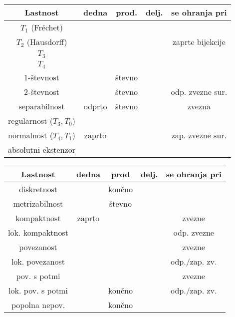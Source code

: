 \documentclass[10pt,a4paper]{article}
\newcommand{\cmark}{\checkmark}%
\newcommand{\xmark}{\ding{55}}%
\begin{document}
\vspace{-3mm}
\begin{table}[htbp]
    \begin{tabular}{|c|c|c|c|c|}\hline
        Lastnost                & dedna & prod. & delj. & se ohranja pri    \\ \hline
        $T_1$ (Fréchet)         & \cmark& \cmark& \xmark&                   \\ \hline
        $T_2$ (Hausdorff)       & \cmark& \cmark& \xmark& zaprte bijekcije  \\ \hline
        $T_3$                   & \cmark& \cmark& \xmark&                   \\ \hline
        $T_4$                   &       &   	& \xmark&                   \\ \hline
        $1$-števnost            & \cmark& števno& \xmark&                   \\ \hline
        $2$-števnost            & \cmark& števno& \xmark& odp. zvezne sur.  \\ \hline
        separabilnost           & odprto& števno& \cmark& zvezna            \\ \hline
        regularnost ($T_3, T_0$)& \cmark& \cmark&       &                   \\ \hline
        normalnost ($T_4, T_1$) & zaprto&       &       & zap. zvezne sur.  \\ \hline
        absolutni ekstenzor     &       & \cmark&       &                   \\ \hline
    \end{tabular}
    \begin{tabular}{|c|c|c|c|c|} \hline
        Lastnost          & dedna & prod  & delj. & se ohranja pri\\ \hline
        diskretnost       & \cmark& končno& \cmark&               \\ \hline
        metrizabilnost    & \cmark& števno& \xmark&               \\ \hline
        kompaktnost       & zaprto& \cmark& \cmark& zvezne        \\ \hline
        lok. kompaktnost  &       & \cmark& \xmark& odp. zvezne   \\ \hline
        povezanost        &       & \cmark& \cmark& zvezne        \\ \hline
        lok. povezanost   &       & \cmark& \cmark& odp./zap. zv.\\ \hline
        pov. s potmi      &       & \cmark& \cmark& zvezne        \\ \hline
        lok. pov. s potmi &       & končno& \cmark& odp./zap. zv. \\ \hline
        popolna nepov.    &       & končno& \xmark&               \\ \hline
    \end{tabular}
\end{table}
\vspace{-4mm}
\end{document}

